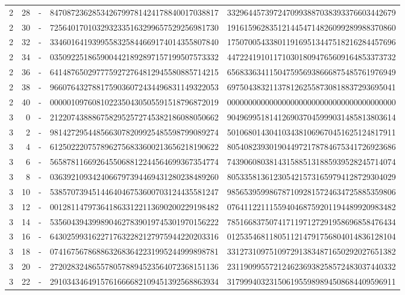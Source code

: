 \begin{longtable}{rrrll}
2 & 28 & - & 8470872362853426799781424178840017038817 & 3329644573972470993887038393376603442679 \\
2 & 30 & - & 7256401701032932335163299657529256981730 & 1916159628351214454714826099289988370860 \\
2 & 32 & - & 3346016419399558325844669174014355807840 & 1750700543380119169513447518216284457696 \\
2 & 34 & - & 0350922518659004421892897157199507573332 & 4472241910117103018094765609164853373732 \\
2 & 36 & - & 6414876502977759272764812945580885714215 & 6568336341150475956938666875485761976949 \\
2 & 38 & - & 9660764327881759036072434496831149322053 & 6975043832113781262558730818837293695041 \\
2 & 40 & - & 0000010976081022350430505591518796872019 & 0000000000000000000000000000000000000000 \\
3 & 0 & - & 2122074388867582952572745382186088050662 & 9049699518141269037045999031485813803614 \\
3 & 2 & - & 9814272954485663078209925485598799089274 & 5010680143041034381069670451625124817911 \\
3 & 4 & - & 6125022207578962756833600213656218190622 & 8054082393019044972178784675341726923686 \\
3 & 6 & - & 5658781166926455068812244564699367354774 & 7439060803814315885131885939528245714074 \\
3 & 8 & - & 0363921093424066797394469431280238489260 & 8053358136123054215731659794128729304029 \\
3 & 10 & - & 5385707394514464046753600703124435581247 & 9856539599867871092815724634725885359806 \\
3 & 12 & - & 0012811479736418633122113690200229198482 & 0764112211155940468759201194489920983482 \\
3 & 14 & - & 5356043943998904627839019745301970156222 & 7851668375074171197127291958696858476434 \\
3 & 16 & - & 6430259931622717632282127975944220203316 & 0125354681180511214791756804014836128104 \\
3 & 18 & - & 0741675678688632683642231995244999898781 & 3312731097510972913834871650292027651382 \\
3 & 20 & - & 2720283248655780578894523564072368151136 & 2311909955721246236938258572483037440332 \\
3 & 22 & - & 2910343464915761666682109451392568863934 & 3179994032315061955989894508684409596911 \\

\end{longtable}
